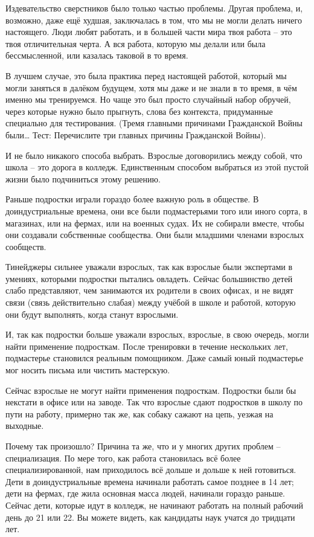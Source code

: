 \documentclass[ebook,12pt,oneside,openany]{memoir}
\begin{document}
Издевательство сверстников было только частью проблемы. Другая
проблема, и, возможно, даже ещё худшая, заключалась в том, что мы не
могли делать ничего настоящего. Люди любят работать, и в большей части
мира твоя работа – это твоя отличительная черта. А вся работа, которую
мы делали или была бессмысленной, или казалась таковой в то время.

В лучшем случае, это была практика перед настоящей работой, который мы
могли заняться в далёком будущем, хотя мы даже и не знали в то время,
в чём именно мы тренируемся. Но чаще это был просто случайный набор
обручей, через которые нужно было прыгнуть, слова без контекста,
придуманные специально для тестирования. (Тремя главными причинами
Гражданской Войны были… Тест: Перечислите три главных причины
Гражданской Войны).

И не было никакого способа выбрать. Взрослые договорились между собой,
что школа – это дорога в колледж. Единственным способом выбраться из
этой пустой жизни было подчиниться этому решению.


Раньше подростки играли гораздо более важную роль в обществе. В
доиндустриальные времена, они все были подмастерьями того или иного
сорта, в магазинах, или на фермах, или на военных судах. Их не
собирали вместе, чтобы они создавали собственные сообщества. Они были
младшими членами взрослых сообществ.

Тинейджеры сильнее уважали взрослых, так как взрослые были экспертами
в умениях, которыми подростки пытались овладеть. Сейчас большинство
детей слабо представляют, чем занимаются их родители в своих офисах, и
не видят связи (связь действительно слабая) между учёбой в школе и
работой, которую они будут выполнять, когда станут взрослыми.

И, так как подростки больше уважали взрослых, взрослые, в свою
очередь, могли найти применение подросткам. После тренировки в течение
нескольких лет, подмастерье становился реальным помощником. Даже самый
юный подмастерье мог носить письма или чистить мастерскую.

Сейчас взрослые не могут найти применения подросткам. Подростки были
бы некстати в офисе или на заводе. Так что взрослые сдают подростков в
школу по пути на работу, примерно так же, как собаку сажают на цепь,
уезжая на выходные.

Почему так произошло? Причина та же, что и у многих других проблем –
специализация. По мере того, как работа становилась всё более
специализированной, нам приходилось всё дольше и дольше к ней
готовиться. Дети в доиндустриальные времена начинали работать самое
позднее в 14 лет; дети на фермах, где жила основная масса людей,
начинали гораздо раньше. Сейчас дети, которые идут в колледж, не
начинают работать на полный рабочий день до 21 или 22. Вы можете
видеть, как кандидаты наук учатся до тридцати лет.
\end{document}
